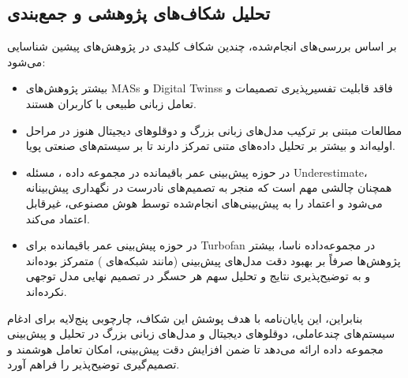\subsection{تحلیل شکاف‌های پژوهشی و جمع‌بندی}
بر اساس بررسی‌های انجام‌شده، چندین شکاف کلیدی در پژوهش‌های پیشین شناسایی می‌شود:
\begin{itemize}
	\item
	 بیشتر پژوهش‌های 
	\glspl{MAS} و
	\glspl{Digital Twins}
	 فاقد قابلیت تفسیرپذیری تصمیمات و تعامل زبانی طبیعی با کاربران هستند.
	 
	\item
	 مطالعات مبتنی بر 
	ترکیب مدل‌های زبانی بزرگ و دوقلوهای دیجیتال
	 هنوز در مراحل اولیه‌اند و بیشتر بر تحلیل داده‌های متنی تمرکز دارند تا بر سیستم‌های صنعتی پویا.
	 
	\item
	 در حوزه پیش‌بینی عمر باقیمانده در مجموعه داده ، مسئله 
	 \gls{Underestimate}،
	  همچنان چالشی مهم است که منجر به تصمیم‌های نادرست در نگهداری پیش‌بینانه می‌شود و اعتماد را به پیش‌بینی‌های انجام‌شده توسط هوش مصنوعی، غیرقابل اعتماد می‌کند.
	
	\item
	در حوزه پیش‌بینی عمر باقیمانده برای \gls{Turbofan} در مجموعه‌داده 
		ناسا، بیشتر پژوهش‌ها صرفاً بر بهبود دقت مدل‌های پیش‌بینی (مانند شبکه‌های ) متمرکز بوده‌اند و به توضیح‌پذیری نتایج و تحلیل سهم هر حسگر در تصمیم نهایی مدل توجهی نکرده‌اند.
	
	
\end{itemize}

بنابراین، این پایان‌نامه با هدف پوشش این شکاف، چارچوبی پنج‌لایه برای ادغام سیستم‌های چندعاملی، دوقلوهای دیجیتال و مدل‌های زبانی بزرگ در تحلیل و پیش‌بینی مجموعه داده  ارائه می‌دهد تا ضمن افزایش دقت پیش‌بینی، امکان تعامل هوشمند و تصمیم‌گیری توضیح‌پذیر را فراهم آورد.



